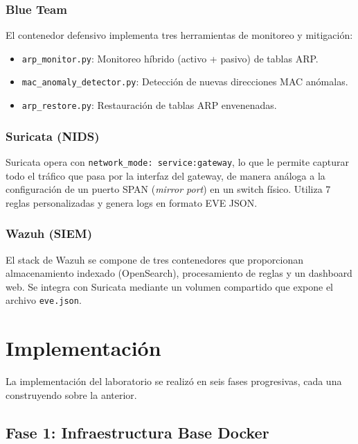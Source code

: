 \documentclass[12pt, a4paper]{article}
\begin{document}
\subsubsection{Blue Team}

El contenedor defensivo implementa tres herramientas de monitoreo y mitigaci\'on:

\begin{itemize}[leftmargin=2cm]
    \item \texttt{arp\_monitor.py}: Monitoreo h\'ibrido (activo + pasivo) de tablas ARP.
    \item \texttt{mac\_anomaly\_detector.py}: Detecci\'on de nuevas direcciones MAC an\'omalas.
    \item \texttt{arp\_restore.py}: Restauraci\'on de tablas ARP envenenadas.
\end{itemize}

\subsubsection{Suricata (NIDS)}

Suricata opera con \texttt{network\_mode: service:gateway}, lo que le permite capturar todo el tr\'afico que pasa por la interfaz del gateway, de manera an\'aloga a la configuraci\'on de un puerto SPAN (\textit{mirror port}) en un switch f\'isico. Utiliza 7 reglas personalizadas y genera logs en formato EVE JSON.

\subsubsection{Wazuh (SIEM)}

El stack de Wazuh se compone de tres contenedores que proporcionan almacenamiento indexado (OpenSearch), procesamiento de reglas y un dashboard web. Se integra con Suricata mediante un volumen compartido que expone el archivo \texttt{eve.json}.

\newpage

\section{Implementaci\'on}

La implementaci\'on del laboratorio se realiz\'o en seis fases progresivas, cada una construyendo sobre la anterior.

\subsection{Fase 1: Infraestructura Base Docker}
\end{document}
